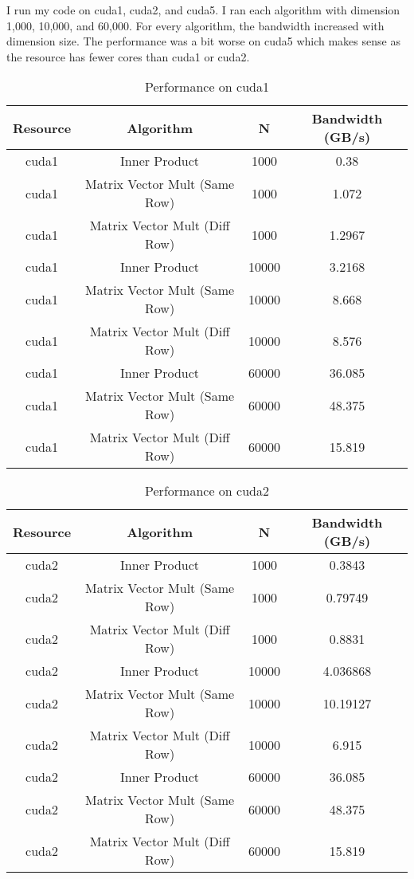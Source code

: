 \documentclass[12pt]{article}
\begin{document}
I run my code on cuda1, cuda2, and cuda5. I ran each algorithm with dimension 1,000, 10,000, and 60,000. For every algorithm, the bandwidth increased with dimension size. The performance was a bit worse on cuda5 which makes sense as the resource has fewer cores than cuda1 or cuda2.


\begin{table}[h!]
\centering
\begin{tabular}{ |c|c|c|c| }
\hline
 Resource & Algorithm & N & Bandwidth (GB/s) \\ 
 \hline
cuda1 & Inner Product & 1000 & 0.38\\
\hline
cuda1 & Matrix Vector Mult (Same Row) & 1000 & 1.072\\
\hline
cuda1 & Matrix Vector Mult (Diff Row) & 1000 & 1.2967\\
\hline
cuda1 & Inner Product & 10000 &  3.2168\\
\hline
cuda1 & Matrix Vector Mult (Same Row) & 10000 & 8.668\\
\hline
cuda1 & Matrix Vector Mult (Diff Row) & 10000 & 8.576\\
\hline
cuda1 & Inner Product & 60000 &  36.085\\
\hline
cuda1 & Matrix Vector Mult (Same Row) & 60000 & 48.375\\
\hline
cuda1 & Matrix Vector Mult (Diff Row) & 60000 & 15.819\\
\hline
\end{tabular}
 \caption{Performance on cuda1}
 \label{cuda1}
 \end{table}


\begin{table}[h!]
\centering
\begin{tabular}{ |c|c|c|c| }
\hline
 Resource & Algorithm & N & Bandwidth (GB/s) \\ 
 \hline
cuda2 & Inner Product & 1000 & 0.3843\\
\hline
cuda2 & Matrix Vector Mult (Same Row) & 1000 & 0.79749\\
\hline
cuda2 & Matrix Vector Mult (Diff Row) & 1000 & 0.8831\\
\hline
cuda2 & Inner Product & 10000 &  4.036868\\
\hline
cuda2 & Matrix Vector Mult (Same Row) & 10000 & 10.19127\\
\hline
cuda2 & Matrix Vector Mult (Diff Row) & 10000 & 6.915\\
\hline
cuda2 & Inner Product & 60000 &  36.085\\
\hline
cuda2 & Matrix Vector Mult (Same Row) & 60000 & 48.375\\
\hline
cuda2 & Matrix Vector Mult (Diff Row) & 60000 & 15.819\\
\hline
\end{tabular}
 \caption{Performance on cuda2}
 \label{cuda2}
 \end{table}
\end{document}
